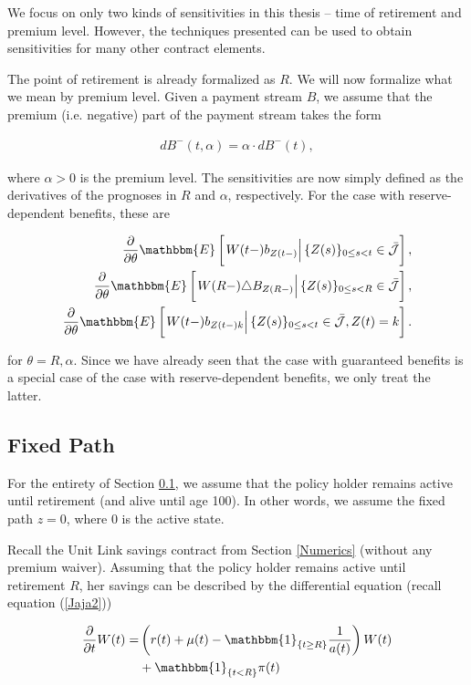 \documentclass{article}
\newcommand{\1}[1]{\mathbbm{1}_{\left\lbrace #1 \right\rbrace}}
\newcommand{\econd}[2][def]{\mathbbm{E} \left[ \left. #1 \right| #2 \right]}
\theoremstyle{break}
\theoremstyle{remark}
\numberwithin{equation}{section}
\begin{document}
We focus on only two kinds of sensitivities in this thesis -- time of retirement and premium level. However, the techniques presented can be used to obtain sensitivities for many other contract elements.

The point of retirement is already formalized as $R$. We will now formalize what we mean by premium level. Given a payment stream $B$, we assume that the premium (i.e. negative) part of the payment stream takes the form

\begin{align*}
	dB^-(t, \alpha) = \alpha \cdot dB^-(t),
\end{align*}

where $\alpha>0$ is the premium level. The sensitivities are now simply defined as the derivatives of the prognoses in $R$ and $\alpha$, respectively. For the case with reserve-dependent benefits, these are

\begin{align*}
	\frac{\partial}{\partial \theta} \econd[W(t-)b_{Z(t-)}]{\{Z(s) \}_{0 \leq s < t} \in \bar{\mathcal{J}}}, \\
	\frac{\partial}{\partial \theta} \econd[W(R-) \triangle B_{Z(R-)}]{\{Z(s) \}_{0 \leq s < R} \in \bar{\mathcal{J}}}, \\
	\frac{\partial}{\partial \theta} \econd[W(t-)b_{Z(t-)k}]{\{Z(s) \}_{0 \leq s < t} \in \bar{\mathcal{J}}, Z(t) = k}.
\end{align*}

for  $\theta = R,\alpha$. Since we have already seen that the case with guaranteed benefits is a special case of the case with reserve-dependent benefits, we only treat the latter.

\newpage
\subsection{Fixed Path} \label{FixedSens}

For the entirety of Section \ref{FixedSens}, we assume that the policy holder remains active until retirement (and alive until age 100). In other words, we assume the fixed path $z=0$, where 0 is the active state.

Recall the Unit Link savings contract from Section \ref{Numerics} (without any premium waiver). Assuming that the policy holder remains active until retirement $R$, her savings can be described by the differential equation (recall equation (\ref{Jaja2}))

\begin{align} \label{ReserveDE}
	\begin{split}
		\frac{\partial}{\partial t}W(t) =& \left( r(t) + \mu(t) - \1{t \geq R} \frac{1}{a(t)}\right) W(t) \\
		&+ \1{t<R} \pi(t)
	\end{split}
\end{align}
\end{document}

